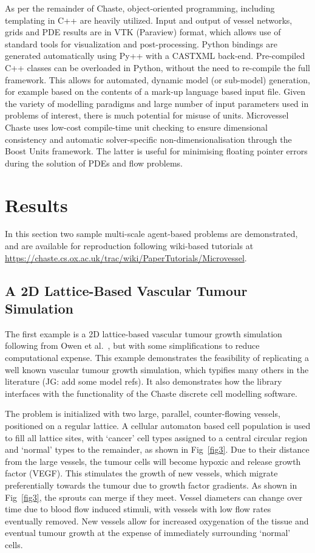 \documentclass[10pt,letterpaper]{article}
\begin{document}
As per the remainder of Chaste, object-oriented programming, including templating in C++ are heavily utilized. Input and output of vessel networks, grids and PDE results are in VTK (Paraview) format, which allows use of standard tools for visualization and post-processing. Python bindings are generated automatically using Py++ with a CASTXML back-end. Pre-compiled C++ classes can be overloaded in Python, without the need to re-compile the full framework. This allows for automated, dynamic model (or sub-model) generation, for example based on the contents of a mark-up language based input file. Given the variety of modelling paradigms and large number of input parameters used in problems of interest, there is much potential for misuse of units. Microvessel Chaste uses low-cost compile-time unit checking to ensure dimensional consistency and automatic solver-specific non-dimensionalisation through the Boost Units framework. The latter is useful for minimising floating pointer errors during the solution of PDEs and flow problems.

\section*{Results}

In this section two sample multi-scale agent-based problems are demonstrated, and are available for reproduction following wiki-based tutorials at \url{https://chaste.cs.ox.ac.uk/trac/wiki/PaperTutorials/Microvessel}.

\subsection*{A 2D Lattice-Based Vascular Tumour Simulation}

The first example is a 2D lattice-based vascular tumour growth simulation following from Owen et al.~\cite{Owen2011}, but with some simplifications to reduce computational expense. This example demonstrates the feasibility of replicating a well known vascular tumour growth simulation, which typifies many others in the literature (JG: add some model refs). It also demonstrates how the library interfaces with the functionality of the Chaste discrete cell modelling software.

The problem is initialized with two large, parallel, counter-flowing vessels, positioned on a regular lattice. A cellular automaton based cell population is used to fill all lattice sites, with `cancer' cell types assigned to a central circular region and `normal' types to the remainder, as shown in Fig~\ref{fig3}. Due to their distance from the large vessels, the tumour cells will become hypoxic and release growth factor (VEGF). This stimulates the growth of new vessels, which migrate preferentially towards the tumour due to growth factor gradients. As shown in Fig~\ref{fig3}, the sprouts can merge if they meet. Vessel diameters can change over time due to blood flow induced stimuli, with vessels with low flow rates eventually removed. New vessels allow for increased oxygenation of the tissue and eventual tumour growth at the expense of immediately surrounding `normal' cells.
\end{document}
